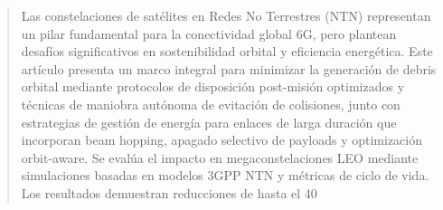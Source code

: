 \begin{abstract}
Las constelaciones de satélites en Redes No Terrestres (NTN) representan un pilar fundamental para la conectividad global 6G, pero plantean desafíos significativos en sostenibilidad orbital y eficiencia energética. Este artículo presenta un marco integral para minimizar la generación de debris orbital mediante protocolos de disposición post-misión optimizados y técnicas de maniobra autónoma de evitación de colisiones, junto con estrategias de gestión de energía para enlaces de larga duración que incorporan beam hopping, apagado selectivo de payloads y optimización orbit-aware. Se evalúa el impacto en megaconstelaciones LEO mediante simulaciones basadas en modelos 3GPP NTN y métricas de ciclo de vida. Los resultados demuestran reducciones de hasta el 40%
\end{abstract}